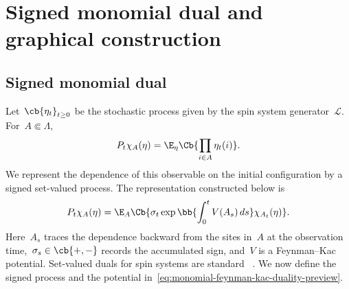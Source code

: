 \section{Signed monomial dual and graphical construction}
\label{sec:signed-dual}

\subsection{Signed monomial dual}
\label{subsec:signed-set-process}

Let~$\cb{\eta_t}_{t\geq 0}$ be the stochastic process given by the spin system generator~$\mathcal{L}$. For~$A\Subset\Lambda$,
\begin{equation*}
P_t\chi_A(\eta)
=
\E_\eta\Cb{\prod_{i\in A}\eta_t(i)}.
\end{equation*}
We represent the dependence of this observable on the initial configuration by a signed
set-valued process. The representation constructed below is
\begin{equation}
\label{eq:monomial-feynman-kac-duality-preview}
P_t\chi_A(\eta)
=
\E_A\Cb{
\sigma_t
\exp\bb{\int_0^t V(A_s)\,ds}
\chi_{A_t}(\eta)
}.
\end{equation}
Here~$A_s$ traces the dependence backward from the sites in~$A$ at the
observation time,~$\sigma_s\in\cb{+,-}$ records the accumulated sign, and~$V$
is a Feynman--Kac potential. Set-valued duals for spin systems are standard
~\cite{Harris1978,Griffeath1979,Gray1986}. We now define the signed process and
the potential in~\eqref{eq:monomial-feynman-kac-duality-preview}.


